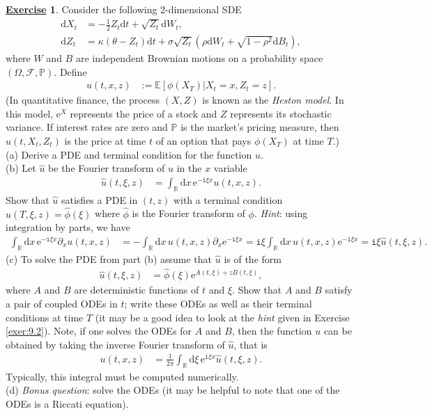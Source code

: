 \documentclass[12pt]{book}
\let\varphi\phi
\numberwithin{equation}{chapter}
\theoremstyle{plain}
\numberwithin{theorem}{section}
\theoremstyle{definition}
\newtheorem{exercise}{\underline{Exercise}}
\numberwithin{exercise}{chapter}
\newcommand{\<}{\langle}
\renewcommand{\>}{\rangle}
\renewcommand{\(}{\left(}
\renewcommand{\)}{\right)}
\renewcommand{\[}{\left[}
\renewcommand{\]}{\right]}
\newcommand\Eb{\mathds{E}}
\newcommand\Pb{\mathds{P}}
\newcommand\Rb{\mathds{R}}
\newcommand\Fc{\mathscr{F}}
\newcommand\Om{\Omega}
\newcommand\sig{\sigma}
\newcommand\varphih{\widehat{\varphi}}
\newcommand\uh{\widehat{u}}
\renewcommand\d{\partial}
\newcommand\ii{\mathtt{i}}
\newcommand\dd{\mathrm{d}}
\newcommand\ee{\mathrm{e}}
\begin{document}
\begin{exercise}
\label{exer:9.4}
Consider the following 2-dimensional SDE
\begin{align}
\dd X_t
	&=	-\frac{1}{2} Z_t \dd t + \sqrt{Z_t} \dd W_t , \\
\dd Z_t
	&=	\kappa (\theta - Z_t) \dd t + \sig \sqrt{Z_t} \( \rho \dd W_t + \sqrt{1-\rho^2} \dd B_t \) ,
\end{align}
where $W$ and $B$ are independent Brownian motions on a probability space $(\Om, \Fc, \Pb)$.  Define
\begin{align}
u(t,x,z)
	&:=	\Eb[ \varphi(X_T) | X_t = x, Z_t = z ] .
\end{align}
(In quantitative finance, the process $(X,Z)$ is known as the \textit{Heston model}.  In this model, $\ee^{X}$ represents the price of a stock and $Z$ represents its stochastic variance.  If interest rates are zero and $\Pb$ is the market's pricing measure, then $u(t,X_t,Z_t)$ is the price at time $t$ of an option that pays $\varphi(X_T)$ at time $T$.)
\\[0.5em]
(a) Derive a PDE and terminal condition for the function $u$.\\
(b) Let $\uh$ be the Fourier transform of $u$ in the $x$ variable
\begin{align}
\uh(t,\xi,z)
	&=	\int_\Rb \dd x \, \ee^{- \ii \xi x} u(t,x,z) .
\end{align}
Show that $\uh$ satisfies a PDE in $(t,z)$ with a terminal condition $\uh(T,\xi,z) = \varphih(\xi)$ where $\varphih$ is the Fourier transform of $\varphi$.
\textit{Hint}: using integration by parts, we have
\begin{align}
\int_\Rb \dd x \, \ee^{- \ii \xi x} \d_x u(t,x,z)
	&=	- \int_\Rb \dd x \, u(t,x,z) \d_x \ee^{- \ii \xi x}
	=		\ii \xi \int_\Rb \dd x \, u(t,x,z) \ee^{- \ii \xi x}
	=		\ii \xi \uh(t,\xi,z) .
\end{align}
(c) To solve the PDE from part (b) assume that $\uh$ is of the form
\begin{align}
\uh(t,\xi,z)
	&=	\varphih(\xi) \ee^{A(t,\xi) + z B(t,\xi)} ,
\end{align}
where $A$ and $B$ are deterministic functions of $t$ and $\xi$.  Show that $A$ and $B$ satisfy a pair of coupled ODEs in $t$; write these ODEs as well as their terminal conditions at time $T$ (it may be a good idea to look at the \textit{hint} given in Exercise \ref{exer:9.2}).  Note, if one solves the ODEs for $A$ and $B$, then the function $u$ can be obtained by taking the inverse Fourier transform of $\uh$, that is
\begin{align}
u(t,x,z)
	&=	\frac{1}{2\pi} \int_\Rb \dd \xi \, \ee^{ \ii \xi x} \uh(t,\xi,z) .
\end{align}
Typically, this integral must be computed numerically.\\
(d) \textit{Bonus question}: solve the ODEs (it may be helpful to note that one of the ODEs is a Riccati equation).
\end{exercise}
\end{document}
